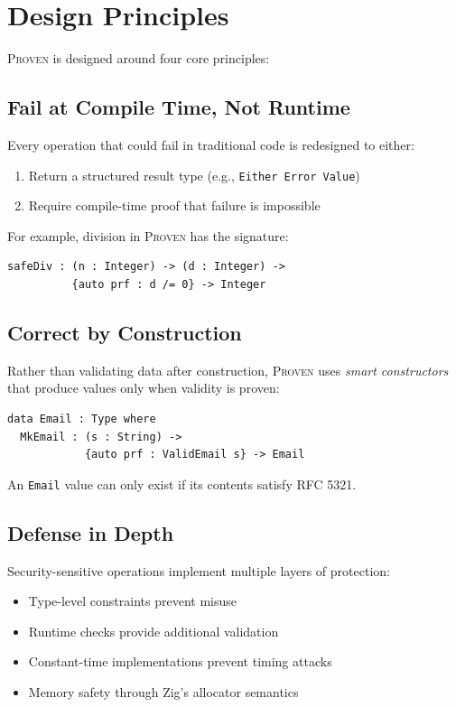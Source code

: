 \documentclass[11pt,a4paper]{article}
\newcommand{\proven}{\textsc{Proven}}
\begin{document}
\section{Design Principles}

\proven{} is designed around four core principles:

\subsection{Fail at Compile Time, Not Runtime}

Every operation that could fail in traditional code is redesigned to either:
\begin{enumerate}
    \item Return a structured result type (e.g., \texttt{Either Error Value})
    \item Require compile-time proof that failure is impossible
\end{enumerate}

For example, division in \proven{} has the signature:

\begin{lstlisting}
safeDiv : (n : Integer) -> (d : Integer) ->
          {auto prf : d /= 0} -> Integer
\end{lstlisting}

\subsection{Correct by Construction}

Rather than validating data after construction, \proven{} uses \emph{smart constructors} that produce values only when validity is proven:

\begin{lstlisting}
data Email : Type where
  MkEmail : (s : String) ->
            {auto prf : ValidEmail s} -> Email
\end{lstlisting}

An \texttt{Email} value can only exist if its contents satisfy RFC 5321.

\subsection{Defense in Depth}

Security-sensitive operations implement multiple layers of protection:

\begin{itemize}
    \item Type-level constraints prevent misuse
    \item Runtime checks provide additional validation
    \item Constant-time implementations prevent timing attacks
    \item Memory safety through Zig's allocator semantics
\end{itemize}
\end{document}
